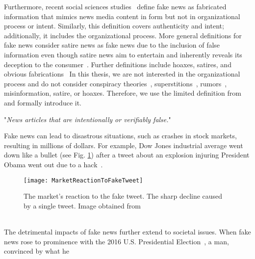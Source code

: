 Furthermore, recent social sciences studies~\parencite{TheScienceOfFakeNews_Lazer, ThePsycologyOfFakeNews_Pennycook} define fake news as fabricated information that mimics news media content in form but not in organizational process or intent. Similarly, this definition covers authenticity and intent; additionally, it includes the organizational process. More general definitions for fake news consider satire news as fake news due to the inclusion of false information even though satire news aim to entertain and inherently reveals its deception to the consumer~\parencite{WhenFakeNewsBecomesReal_Balmas, TheImpactOfRealNewsAboutFakeNews_Brewer, NewsVerificationByExploitingConflictingSocialViewpoints_Jin, FakeNewsOrTruthUsingSatiricalCues_Rubin}. Further definitions include hoaxes, satires, and obvious
fabrications~\parencite{DeceptionDetectionForFakeNews3TypesOfFakeNews_Rubin}
In this thesis, we are not interested in the organizational process and do not consider conspiracy theories~\parencite{ConspiracyTheories_Sunstein}, superstitions~\parencite{Superstition_Lindeman}, rumors~\parencite{RumorsAndHealthCareReform_Berinsky}, misinformation, satire, or hoaxes. Therefore, we use the limited definition from~\parencite{SocialMediaAndFakeNewsIn2016Election_Allcott} and formally introduce it.
\begin{definition}
    "\emph{News articles that are intentionally or verifiably false.}"~\parencite{SocialMediaAndFakeNewsIn2016Election_Allcott}
\end{definition}
Fake news can lead to disastrous situations, such as crashes in stock markets, resulting in millions of dollars. For example, Dow Jones
industrial average went down like a bullet (see Fig. \ref{fig:MarketReactionToFakeTweet}) after a tweet about an explosion injuring President Obama
went out due to a hack~\parencite{MarketQuaversAfterFakeAPTweet_ElBoghdady}.
\begin{figure}
    \centering
    \texttt{[image: MarketReactionToFakeTweet]}
    \caption[Market Reaction to Fake Tweet]{The market's reaction to the fake tweet. The sharp decline caused by a single tweet. Image obtained from~\parencite{MarketQuaversAfterFakeAPTweet_ElBoghdady}}\label{fig:MarketReactionToFakeTweet}
\end{figure}\\
The detrimental impacts of fake news further extend to societal issues.
When fake news rose to prominence with the 2016 U.S. Presidential Election~\parencite{USPresidentialElection2016}, a man, convinced by what he
